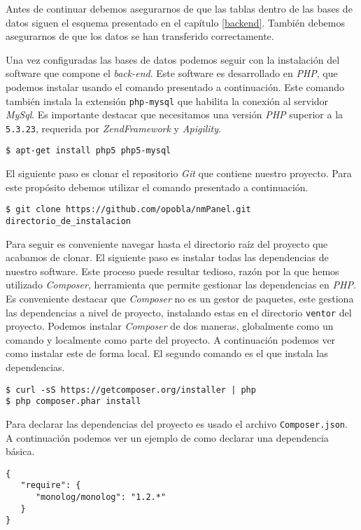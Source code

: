 	Antes de continuar debemos asegurarnos de que las tablas dentro de las bases de datos siguen el esquema presentado en el capítulo
	\ref{backend}. También debemos asegurarnos de que los datos se han transferido correctamente.
	\par
	Una vez configuradas las bases de datos podemos seguir con la instalación del software que compone el \emph{back-end}. Este software es
	desarrollado en \emph{PHP}, que podemos instalar usando el comando presentado a continuación. Este comando también instala la extensión
	\texttt{php-mysql} que habilita la conexión al servidor \emph{MySql}. Es importante destacar que necesitamos una versión \emph{PHP} superior a la
	\texttt{5.3.23}, requerida por \emph{ZendFramework} y \emph{Apigility}.
	\begin{lstlisting}[style=myBash]
$ apt-get install php5 php5-mysql
	\end{lstlisting}
	El siguiente paso es clonar el repositorio \emph{Git} que contiene nuestro proyecto. Para este propósito debemos utilizar el comando presentado a
	continuación.
	\begin{lstlisting}[style=myBash]
$ git clone https://github.com/opobla/nmPanel.git directorio_de_instalacion
	\end{lstlisting}
	Para seguir es conveniente navegar hasta el directorio raíz del proyecto que acabamos de clonar. El siguiente paso es instalar todas las
	dependencias de nuestro software. Este proceso puede resultar tedioso, razón por la que hemos utilizado \emph{Composer}, herramienta que permite
	gestionar las dependencias en \emph{PHP}. Es conveniente destacar que \emph{Composer} no es un gestor de paquetes, este gestiona las dependencias a nivel de
	proyecto, instalando estas en el directorio \texttt{ventor} del proyecto. Podemos instalar \emph{Composer} de dos maneras, globalmente como un
	comando y localmente como parte del proyecto. A continuación podemos ver como instalar este de forma local. El segundo comando es el que
	instala las dependencias. 
	\begin{lstlisting}[style=myBash]
$ curl -sS https://getcomposer.org/installer | php
$ php composer.phar install
	\end{lstlisting}
	Para declarar las dependencias del proyecto es usado el archivo \texttt{Composer.json}. A continuación podemos ver un ejemplo de como declarar
	una dependencia básica. 
	\begin{lstlisting}[style=myFile]
{
   "require": {
      "monolog/monolog": "1.2.*"
   }
}
	\end{lstlisting}
